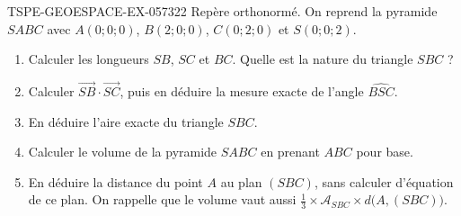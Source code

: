 \begin{exercice}{TSPE-GEOESPACE-EX-057}{3}{22}
Repère orthonormé. On reprend la pyramide $SABC$ avec
$A(0;0;0)$, $B(2;0;0)$, $C(0;2;0)$ et $S(0;0;2)$.
\begin{enumerate}
  \item Calculer les longueurs $SB$, $SC$ et $BC$. Quelle est la nature du
        triangle $SBC$ ?
  \item Calculer $\vec{SB}\cdot\vec{SC}$, puis en déduire la mesure exacte de
        l'angle $\widehat{BSC}$.
  \item En déduire l'aire exacte du triangle $SBC$.
  \item Calculer le volume de la pyramide $SABC$ en prenant $ABC$ pour base.
  \item En déduire la distance du point $A$ au plan $(SBC)$, sans calculer
        d'équation de ce plan. On rappelle que le volume vaut aussi
        $\tfrac13\times\mathcal{A}_{SBC}\times d\bigl(A,(SBC)\bigr)$.
\end{enumerate}
\end{exercice}
